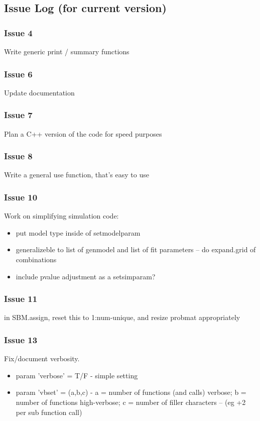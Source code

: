 \documentclass[11pt]{article}
\begin{document}
\subsection{Issue Log (for current version)}

\subsubsection*{Issue 4}
Write generic print / summary functions

\subsubsection*{Issue 6}
Update documentation

\subsubsection*{Issue 7}
Plan a C++ version of the code for speed purposes

\subsubsection*{Issue 8}
Write a general use function, that's easy to use

\subsubsection*{Issue 10}
Work on simplifying simulation code: 
\begin{itemize}
\item put model type inside of setmodelparam
\item generalizeble to list of genmodel and list of fit parameters -- do expand.grid of combinations
\item include pvalue adjustment as a setsimparam?
\end{itemize}

\subsubsection*{Issue 11}
in SBM.assign, reset this to 1:num-unique, and resize probmat appropriately

\subsubsection*{Issue 13}
Fix/document verbosity. 
\begin{itemize}
\item param 'verbose' = T/F - simple setting
\item param 'vbset' = (a,b,c) - a = number of functions (and calls) verbose; b = number of functions high-verbose; c = number of filler characters -- (eg +2 per sub function call)
\end{itemize}
\end{document}
